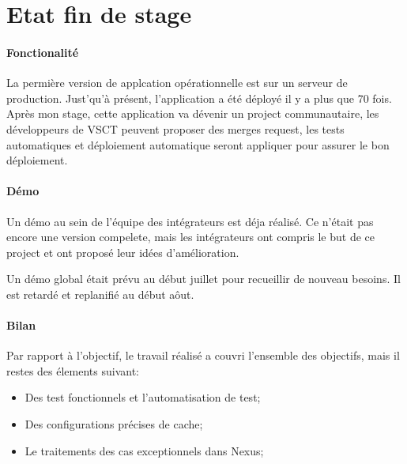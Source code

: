 \section{Etat fin de stage}

\paragraph{Fonctionalité}
La permière version de applcation opérationnelle est sur un serveur de production.
Just'qu'à présent, l'application a été déployé il y a plus que 70 fois.
Après mon stage, cette application va dévenir un project communautaire,
les développeurs de VSCT peuvent proposer des merges request,
les tests automatiques et déploiement automatique seront appliquer pour assurer le bon déploiement.

\paragraph{Démo}
Un démo au sein de l'équipe des intégrateurs est déja réalisé.
Ce n'était pas encore une version compelete, mais les intégrateurs ont compris le but de ce project et ont proposé leur idées d'amélioration.

Un démo global était prévu au début juillet pour recueillir de nouveau besoins. Il est retardé et replanifié au début aôut.

\paragraph{Bilan}
Par rapport à l'objectif, le travail réalisé a couvri l'ensemble des objectifs, mais il restes des élements suivant:
\begin{itemize}
  \item Des test fonctionnels et l'automatisation de test;
  \item Des configurations précises de cache;
  \item Le traitements des cas exceptionnels dans Nexus;
\end{itemize}

\clearpage
